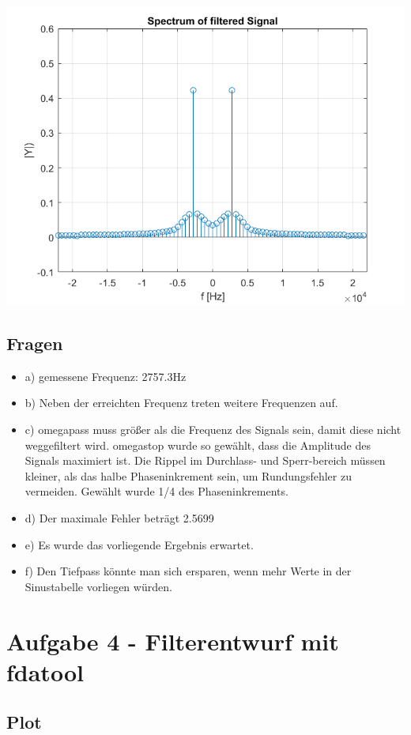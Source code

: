 \includegraphics[scale=0.45]{../ue04_b3_4.png}

\subsection{Fragen}
\begin{itemize}
\item{a)} gemessene Frequenz: 2757.3Hz
\item{b)} Neben der erreichten Frequenz treten weitere Frequenzen auf.
\item{c)} omegapass muss größer als die Frequenz des Signals sein, damit diese nicht weggefiltert wird. omegastop wurde so gewählt, dass die Amplitude des Signals maximiert ist. Die Rippel im Durchlass- und Sperr-bereich müssen kleiner, als das halbe Phaseninkrement sein, um Rundungsfehler zu vermeiden. Gewählt wurde 1/4 des Phaseninkrements.
\item{d)} Der maximale Fehler beträgt 2.5699%
\item{e)} Es wurde das vorliegende Ergebnis erwartet.
\item{f)} Den Tiefpass könnte man sich ersparen, wenn mehr Werte in der Sinustabelle vorliegen würden.
\end{itemize}

\newpage

\section{Aufgabe 4 - Filterentwurf mit fdatool}

\subsection{Plot}

